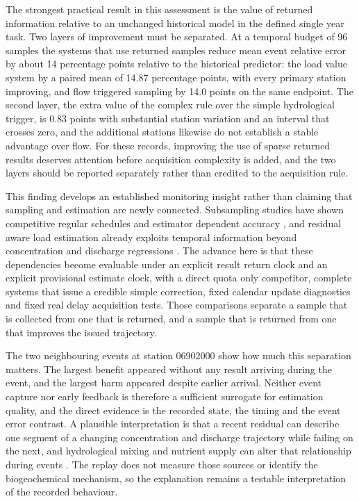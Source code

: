 \documentclass[pdflatex,sn-mathphys-num]{sn-jnl}%
\theoremstyle{thmstyleone}%
\theoremstyle{thmstyletwo}%
\theoremstyle{thmstylethree}%
\begin{document}
The strongest practical result in this assessment is the value of returned information relative to an unchanged historical model in the defined single year task. Two layers of improvement must be separated. At a temporal budget of 96 samples the systems that use returned samples reduce mean event relative error by about 14 percentage points relative to the historical predictor: the load value system by a paired mean of 14.87 percentage points, with every primary station improving, and flow triggered sampling by 14.0 points on the same endpoint. The second layer, the extra value of the complex rule over the simple hydrological trigger, is 0.83 points with substantial station variation and an interval that crosses zero, and the additional stations likewise do not establish a stable advantage over flow. For these records, improving the use of sparse returned results deserves attention before acquisition complexity is added, and the two layers should be reported separately rather than credited to the acquisition rule.

This finding develops an established monitoring insight rather than claiming that sampling and estimation are newly connected. Subsampling studies have shown competitive regular schedules and estimator dependent accuracy \citep{reynolds2016,lee2016,lee2019}, and residual aware load estimation already exploits temporal information beyond concentration and discharge regressions \citep{zhang2019}. The advance here is that these dependencies become evaluable under an explicit result return clock and an explicit provisional estimate clock, with a direct quota only competitor, complete systems that issue a credible simple correction, fixed calendar update diagnostics and fixed real delay acquisition tests. Those comparisons separate a sample that is collected from one that is returned, and a sample that is returned from one that improves the issued trajectory.

The two neighbouring events at station 06902000 show how much this separation matters. The largest benefit appeared without any result arriving during the event, and the largest harm appeared despite earlier arrival. Neither event capture nor early feedback is therefore a sufficient surrogate for estimation quality, and the direct evidence is the recorded state, the timing and the event error contrast. A plausible interpretation is that a recent residual can describe one segment of a changing concentration and discharge trajectory while failing on the next, and hydrological mixing and nutrient supply can alter that relationship during events \citep{bieroza2018}. The replay does not measure those sources or identify the biogeochemical mechanism, so the explanation remains a testable interpretation of the recorded behaviour.
\end{document}
